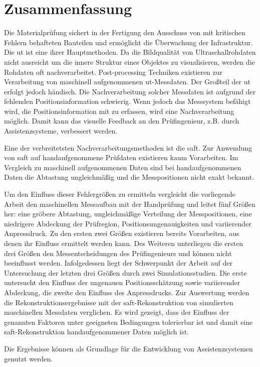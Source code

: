 \chapter*{\centering Zusammenfassung} %
Die Materialprüfung sichert in der Fertigung den Ausschuss von mit kritischen Fehlern behafteten Bauteilen und ermöglicht die Überwachung der Infrastruktur. Die \acrfull{ut} ist eine ihrer Hauptmethoden. Da die Bildqualität von Ultraschallrohdaten nicht ausreicht um die innere Struktur eines Objektes zu visualisieren, werden die Rohdaten oft nachverarbeitet. Post-processing Techniken existieren zur Verarbeitung von maschinell aufgenommenen \acrshort{ut}-Messdaten. Der Großteil der \acrshort{ut} erfolgt jedoch händisch. Die Nachverarbeitung solcher Messdaten ist aufgrund der fehlenden Positionsinformation schwierig. Wenn jedoch das Messsystem befähigt wird, die Positionsinformation mit zu erfassen, wird eine Nachverarbeitung möglich. Damit kann das visuelle Feedback an den Prüfingenieur, z.B. durch Assistenzsysteme, verbessert werden.\par
Eine der verbreitetsten Nachverarbeitungsmethoden ist die \acrfull{saft}. Zur Anwendung von \acrshort{saft} auf handaufgenommene Prüfdaten existieren kaum Vorarbeiten. Im Vergleich zu maschinell aufgenommenen Daten sind bei handaufgenommenen Daten die Abtastung ungleichmäßig und die Messpositionen nicht exakt bekannt.\par
Um den Einfluss dieser Fehlergrößen zu ermitteln vergleicht die vorliegende Arbeit den maschinellen Messaufbau mit der Handprüfung und leitet fünf Größen her: eine gröbere Abtastung, ungleichmäßige Verteilung der Messpositionen, eine niedrigere Abdeckung der Prüfregion, Positionsungenauigkeiten und variierender Anpressdruck. Zu den ersten zwei Größen existieren bereits Vorarbeiten, aus denen ihr Einfluss ermittelt werden kann. Des Weiteren unterliegen die ersten drei Größen den Messentscheidungen des Prüfingenieurs und können nicht beeinflusst werden. Infolgedessen liegt der Schwerpunkt der Arbeit auf der Untersuchung der letzten drei Größen durch zwei Simulationsstudien.
Die erste untersucht den Einfluss der ungenauen Positionsschätzung sowie variierender Abdeckung, die zweite den Einfluss des Anpressdrucks.
Zur Auswertung werden die Rekonstruktionsergebnisse mit der \acrshort{saft}-Rekonstruktion von simulierten maschinellen Messdaten verglichen. Es wird gezeigt, dass der Einfluss der genannten Faktoren unter geeigneten Bedingungen tolerierbar ist und damit eine \acrshort{saft}-Rekonstruktion handaufgenommener Daten möglich ist.\par
Die Ergebnisse können als Grundlage für die Entwicklung von Assistenzsystemen genutzt werden.



